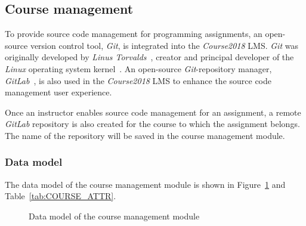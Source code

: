 
\subsection{Course management}
To provide source code management for programming assignments,
an open-source version control tool,
\emph{Git}, is integrated into the \emph{Course2018} LMS.
\emph{Git} was originally developed by \emph{Linus Torvalds}~\cite{git},
creator and principal developer of the \emph{Linux} operating system
kernel~\cite{lTorvalds}.
An open-source \emph{Git}-repository manager, \emph{GitLab}~\cite{Agitlab},
is also used in the \emph{Course2018} LMS to enhance the source code management
user experience.

\medskip
Once an instructor enables source code management for an assignment, a remote
\emph{GitLab} repository is also created for the course to which the assignment
belongs. The name of the repository will be saved in the course management
module.


\subsubsection{Data model}
The data model of the course management module is shown in
Figure~\ref{fig:COURSE_ER} and Table~\ref{tab:COURSE_ATTR}. \bigskip

\begin{figure}[ht]
    \centering

    \usetikzlibrary{er, positioning}

    \caption{Data model of the course management module}
    \label{fig:COURSE_ER}
\end{figure}

